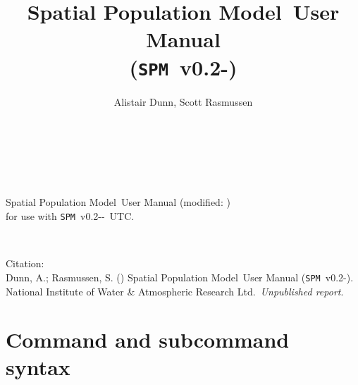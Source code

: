 \documentclass[11pt,twoside,pdftex]{article}
\renewcommand{\headrulewidth}{0pt}
\begin{document}

\newcommand{\DocYear}{\SourceControlYearDoc}
\newcommand{\DocMonth}{\SourceControlMonthDoc}
\newcommand{\DocDate}{\SourceControlMonthDoc\ \SourceControlYearDoc}
\newcommand{\DocVer}{\SourceControlDateDoc}


\newcommand{\VER}{0.2-\SourceControlDateSPM}

\newcommand{\SPM}{\texttt{SPM}}
\newcommand{\SPMName}{Spatial Population Model}
\newcommand{\authors}{\href{mailto:"Alistair Dunn"<a.dunn@niwa.co.nz>?subject=SPM:}{authors}}
\newcommand{\Organisation}{National Institute of Water \& Atmospheric Research Ltd.}
\newcommand{\ManualRef}{Dunn, A.; Rasmussen, S. (\DocYear) \SPMName\ User Manual (\SPM\ v\VER). \Organisation\ \emph{Unpublished report}.} 
\title{\SPMName\ User Manual \\(\SPM\ v\VER)}
\author{Alistair Dunn, Scott Rasmussen}
\date{\DocDate}


\maketitle 
\thispagestyle{empty}
~\vfill
\begin{center}
\SPMName\ User Manual (modified: \DocVer) \\
for use with \SPM\ v\VER-\SourceControlTimeSPM\ UTC.
\end{center}

\cleardoublepage{}
\fancyfoot[C]{\thepage}
~\vfill
\begin{center}
{Citation:\\ \ManualRef}
\end{center}

\cleardoublepage{}
\tableofcontents{}

\cleardoublepage{}
\renewcommand{\headrulewidth}{0.2pt}
\fancyhead[LE]{\slshape \nouppercase \rightmark}
\fancyhead[RO]{\slshape \nouppercase \leftmark}


\cleardoublepage{}


\cleardoublepage{}


\cleardoublepage{}


\cleardoublepage{}


\cleardoublepage{}
\section{Command and subcommand syntax\label{sec:syntax}}




\end{document}
